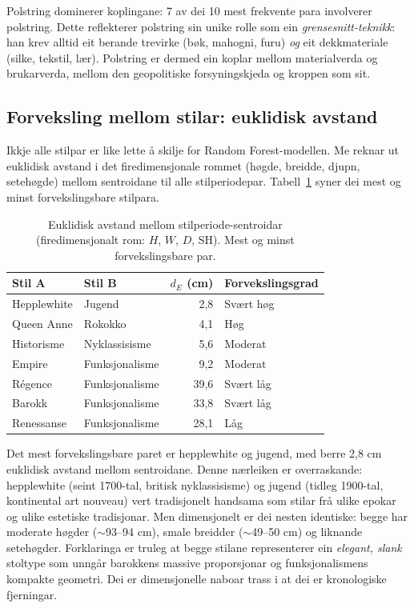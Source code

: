 \documentclass[10pt, a4paper, twocolumn]{article}
\begin{document}
Polstring dominerer koplingane: 7 av dei 10 mest frekvente para involverer polstring. Dette reflekterer polstring sin unike rolle som ein \emph{grensesnitt-teknikk}: han krev alltid eit berande trevirke (bøk, mahogni, furu) \emph{og} eit dekkmateriale (silke, tekstil, lær). Polstring er dermed ein koplar mellom materialverda og brukarverda, mellom den geopolitiske forsyningskjeda og kroppen som sit.


\subsection{Forveksling mellom stilar: euklidisk avstand}

Ikkje alle stilpar er like lette å skilje for Random Forest-modellen. Me reknar ut euklidisk avstand i det firedimensjonale rommet (høgde, breidde, djupn, setehøgde) mellom sentroidane til alle stilperiodepar. Tabell~\ref{tab:confusion} syner dei mest og minst forvekslingsbare stilpara.

\begin{table}[H]
\centering
\caption{Euklidisk avstand mellom stilperiode-sentroidar (firedimensjonalt rom: $H$, $W$, $D$, SH). Mest og minst forvekslingsbare par.}
\label{tab:confusion}
\begin{tabular}{@{}llrl@{}}
\toprule
\textbf{Stil A} & \textbf{Stil B} & \textbf{$d_E$ (cm)} & \textbf{Forvekslingsgrad} \\
\midrule
Hepplewhite & Jugend & 2,8 & Svært høg \\
Queen Anne & Rokokko & 4,1 & Høg \\
Historisme & Nyklassisisme & 5,6 & Moderat \\
Empire & Funksjonalisme & 9,2 & Moderat \\
\midrule
Régence & Funksjonalisme & 39,6 & Svært låg \\
Barokk & Funksjonalisme & 33,8 & Svært låg \\
Renessanse & Funksjonalisme & 28,1 & Låg \\
\bottomrule
\end{tabular}
\end{table}

Det mest forvekslingsbare paret er hepplewhite og jugend, med berre 2,8 cm euklidisk avstand mellom sentroidane. Denne nærleiken er overraskande: hepplewhite (seint 1700-tal, britisk nyklassisisme) og jugend (tidleg 1900-tal, kontinental art nouveau) vert tradisjonelt handsama som stilar frå ulike epokar og ulike estetiske tradisjonar. Men dimensjonelt er dei nesten identiske: begge har moderate høgder ($\sim$93--94 cm), smale breidder ($\sim$49--50 cm) og liknande setehøgder. Forklaringa er truleg at begge stilane representerer ein \emph{elegant, slank} stoltype som unngår barokkens massive proporsjonar og funksjonalismens kompakte geometri. Dei er dimensjonelle naboar trass i at dei er kronologiske fjerningar.
\end{document}
